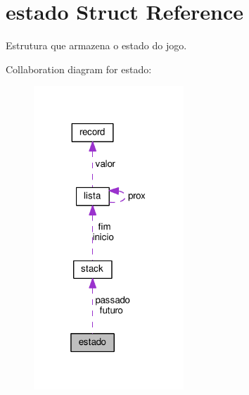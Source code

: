 \hypertarget{structestado}{\section{estado Struct Reference}
\label{structestado}
}


Estrutura que armazena o estado do jogo.  




Collaboration diagram for estado\+:\nopagebreak
\begin{figure}[H]
\begin{center}
\leavevmode
\includegraphics[width=160pt]{structestado__coll__graph}
\end{center}
\end{figure}
